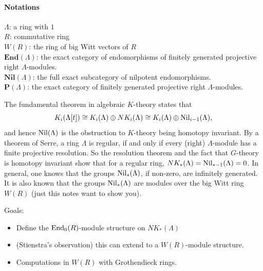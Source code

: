 \paragraph{Notations} $\Lambda$: a ring with $1$\\
$R$: commutative ring \\
$W(R)$: the ring of big Witt vectors of $R$\\
$\mathbf{End}(\Lambda)$: the exact category of endomorphisms of finitely generated projective right $\Lambda$-modules.\\
$\mathbf{Nil}(\Lambda)$: the full exact subcategory of nilpotent endomorphisms.\\
$\mathbf{P}(\Lambda)$: the exact category of finitely generated projective right $\Lambda$-modules.

The fundamental theorem in algebraic $K$-theory states that
\[K_i(\Lambda[t])\cong K_i(\Lambda)\oplus NK_i(\Lambda)\cong K_i(\Lambda)\oplus \mathrm{Nil}_{i-1}(\Lambda),\]
and hence $\mathrm{Nil}(\Lambda)$ is the obstruction to $K$-theory being homotopy invariant. By a theorem of Serre, a ring $\Lambda$ is regular, if and only if every (right) $\Lambda$-module has a finite projective resolution. So the resolution theorem and the fact that $G$-theory is homotopy invariant show that for a regular ring, $NK_
*(\Lambda)=\mathrm{Nil}_{*-1}(\Lambda) = 0$. In general, one knows that the groups $\mathrm{Nil}_*(\Lambda)$, if non-zero, are infinitely generated. It is also known that the groups $\mathrm{Nil}_*(\Lambda)$ are modules over the big Witt ring $W(R)$ (just this notes want to show you).

Goals:
\begin{itemize}
	\item Define the $\mathrm{End}_0(R)$-module structure on $NK_*(\Lambda)$ 
	\item (Stienstra's observation) this can extend to a $W(R)$-module structure.
	\item Computations in $W(R)$ with Grothendieck rings.
\end{itemize}
